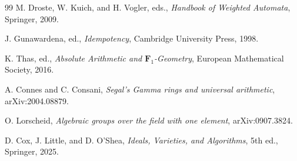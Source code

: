 \documentclass[11pt]{article}
\theoremstyle{plain}
\theoremstyle{definition}
\begin{document}
\begin{thebibliography}{99}
M. Droste, W. Kuich, and H. Vogler, eds.,
\emph{Handbook of Weighted Automata}, Springer, 2009.

J. Gunawardena, ed.,
\emph{Idempotency}, Cambridge University Press, 1998.

K. Thas, ed.,
\emph{Absolute Arithmetic and \(\mathbf F_1\)-Geometry}, European Mathematical Society, 2016.

A. Connes and C. Consani,
\emph{Segal's Gamma rings and universal arithmetic}, arXiv:2004.08879.

O. Lorscheid,
\emph{Algebraic groups over the field with one element}, arXiv:0907.3824.

D. Cox, J. Little, and D. O'Shea,
\emph{Ideals, Varieties, and Algorithms}, 5th ed., Springer, 2025.

\end{thebibliography}
\end{document}
